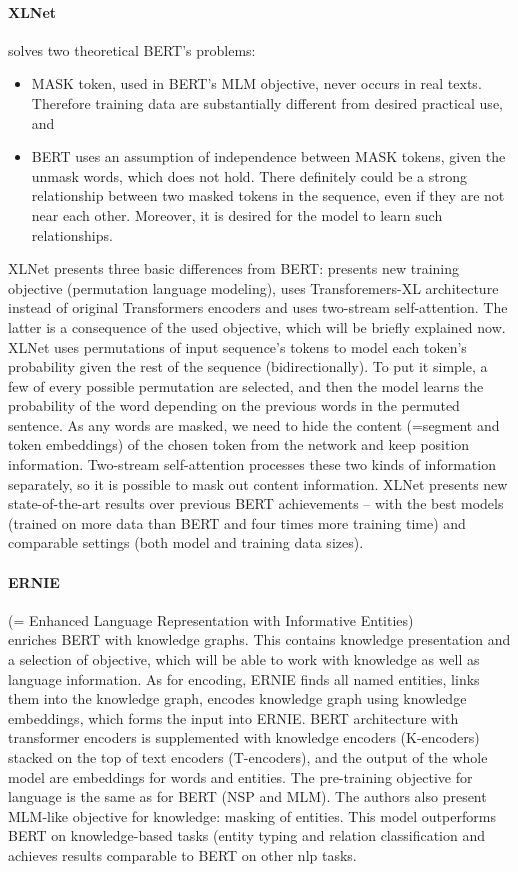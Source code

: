 \paragraph{XLNet} \citep{Yang2019a} solves two theoretical BERT's problems:
\begin{itemize}
\item MASK token, used in BERT's MLM objective, never occurs in real texts. Therefore training data are substantially different from desired practical use, and
\item BERT uses an assumption of independence between MASK tokens, given the unmask words, which does not hold. There definitely could be a strong relationship between two masked tokens in the sequence, even if they are not near each other. Moreover, it is desired for the model to learn such relationships.
\end{itemize}
XLNet presents three basic differences from BERT: presents new training objective (permutation language modeling), uses Transforemers-XL \citep{Dai2019} architecture instead of original Transformers encoders and uses two-stream self-attention. The latter is a consequence of the used objective, which will be briefly explained now. XLNet uses permutations of input sequence's tokens to model each token's probability given the rest of the sequence (bidirectionally). To put it simple, a few of every possible permutation are selected, and then the model learns the probability of the word depending on the previous words in the permuted sentence. As any words are masked, we need to hide the content (=segment and token embeddings) of the chosen token from the network and keep position information. Two-stream self-attention processes these two kinds of information separately, so it is possible to mask out content information. XLNet presents new state-of-the-art results over previous BERT achievements -- with the best models (trained on more data than BERT and four times more training time) and comparable settings (both model and training data sizes).
\paragraph{ERNIE} (= Enhanced Language Representation with Informative Entities)\\ \citep{Zhang2019} enriches BERT with knowledge graphs. This contains knowledge presentation and a selection of objective, which will be able to work with knowledge as well as language information. As for encoding, ERNIE finds all named entities, links them into the knowledge graph, encodes knowledge graph using knowledge embeddings, which forms the input into ERNIE. BERT architecture with transformer encoders is supplemented with knowledge encoders (K-encoders) stacked on the top of text encoders (T-encoders), and the output of the whole model are embeddings for words and entities. The pre-training objective for language is the same as for BERT (NSP and MLM). The authors also present MLM-like objective for knowledge: masking of entities. This model outperforms BERT on knowledge-based tasks (entity typing and relation classification and achieves results comparable to BERT on other \acrshort{nlp} tasks.
